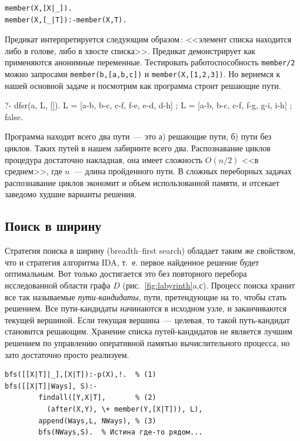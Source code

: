 \documentclass[a4paper,14pt, openany, twoside, draft]{extbook} %
\begin{document}
\begin{verbatim}
member(X,[X|_]).
member(X,[_|T]):-member(X,T).
\end{verbatim}


Предикат интерпретируется следующим образом\,: <<элемент списка находится либо в голове, либо в хвосте списка>>.  Предикат демонстрирует как применяются анонимные переменные.  Тестировать работоспособность \texttt{member/2} можно запросами \texttt{member(b,[a,b,c])} и \texttt{member(X,[1,2,3])}.  Но вернемся к нашей основной задаче и посмотрим как программа строит решающие пути.

\begin{proexp}
?- dfsr(a, L, []).
L = [a-b, b-c, c-f, f-e, e-d, d-h] ;
L = [a-b, b-c, c-f, f-g, g-i, i-h] ;
false.
\end{proexp}


Программа находит всего два пути~--- это а) решающие пути, б) пути без циклов.  Таких путей в нашем лабиринте всего два.  Распознавание циклов процедура достаточно накладная, она имеет сложность $O(n/2)$ <<в среднем>>, где $n$~--- длина пройденного пути.  В сложных переборных задачах \cite{monograph} распознавание циклов экономит и объем использованной памяти, и отсекает заведомо худшие варианты решения.

\subsection{Поиск в ширину}
\label{sec:breadthfirst}

Стратегия поиска в ширину (\foreignlanguage{english}{breadth--first search}) обладает таким же свойством, что и стратегия алгоритма IDA, т.~е. первое найденное решение будет оптимальным.  Вот только достигается это без повторного перебора исследованной области графа $D$ (рис.~\ref{fig:labyrinth}a,с).  Процесс поиска хранит все так называемые  \emph{пути-кандидаты}, пути, претендующие на то, чтобы стать решением.  Все пути-кандидаты начинаются в исходном узле, и заканчиваются текущей вершиной.  Если текущая вершина~--- целевая, то такой путь-кандидат становится решающим.  Хранение списка путей-кандидатов не является лучшим решением по управлению оперативной памятью вычислительного процесса, но зато достаточно просто реализуем.

\begin{verbatim}
bfs([[X|T]|_],[X|T]):-p(X),!.  % (1)
bfs([[X|T]|Ways], S):-
        findall([Y,X|T],       % (2)
          (after(X,Y), \+ member(Y,[X|T])), L),
        append(Ways,L, NWays), % (3)
        bfs(NWays,S).  % Истина где-то рядом...
\end{verbatim}
\end{document}
